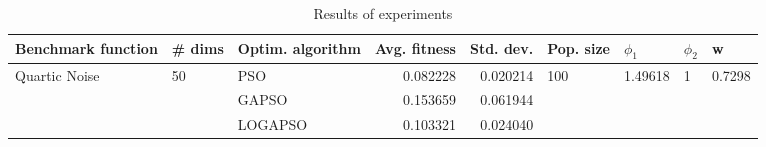 \begin{table}
\centering
\caption{Results of experiments}
\begin{tabular}{lllrrllll}
\toprule
            Benchmark function &             \# dims & Optim. algorithm &  Avg. fitness &  Std. dev. &            Pop. size &               $\phi_{1}$ &         $\phi_{2}$ &                       w \\
\midrule
\multirow{3}{*}{Quartic Noise} & \multirow{3}{*}{50} &              PSO &      0.082228 &   0.020214 & \multirow{3}{*}{100} & \multirow{3}{*}{1.49618} & \multirow{3}{*}{1} & \multirow{3}{*}{0.7298} \\
                               &                     &            GAPSO &      0.153659 &   0.061944 &                      &                          &                    &                         \\
                               &                     &          LOGAPSO &      0.103321 &   0.024040 &                      &                          &                    &                         \\
\bottomrule
\end{tabular}
\end{table}
